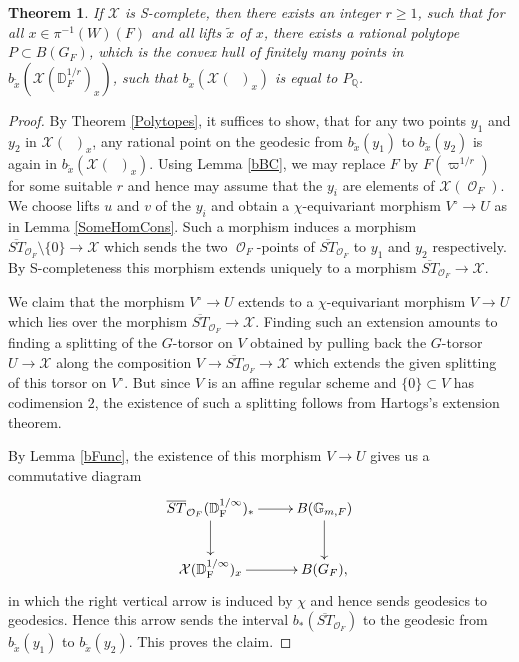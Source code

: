 \documentclass{article}
\DeclareMathOperator{\CO}{\mathcal{O}}
\newcommand{\BG}{{\mathbb{G}}}
\newcommand{\BQ}{{\mathbb{Q}}}
\newcommand{\CX}{{\mathcal X}}
\newcommand{\Dr}[1][r]{\mathbb{D}_F^{1/#1}}
\DeclareMathOperator{\Dinfty}{\mathbb{D}_F^{1/\infty}}
\theoremstyle{definition}
\theoremstyle{plain}
\newtheorem{theorem}[definition]{Theorem}
\begin{document}
\begin{theorem}\label{conhul}
    If $\CX$ is S-complete, then there exists an integer $r \geq 1$, such that for all $x \in \pi^{-1}(W)(F)$ and all lifts $\tilde x$ of $x$, there exists a rational polytope $P \subset B(G_F)$, which is the convex hull of finitely many points in $b_{\tilde x}(\CX(\Dr)_x)$, such that $b_{\tilde x}(\CX(\Dinfty)_x)$ is equal to $P_\BQ$. 
\end{theorem}
\begin{proof}
    By Theorem \ref{Polytopes}, it suffices to show, that for any two points $y_1$ and $y_2$ in $\CX(\Dinfty)_x$, any rational point on the geodesic from $b_{\tilde x}(y_1)$ to $b_{\tilde x}(y_2)$ is again in $b_{\tilde x}(\CX(\Dinfty)_x)$. Using Lemma \ref{bBC}, we may replace $F$ by $F(\varpi^{1/r})$ for some suitable $r$ and hence may assume that the $y_i$ are elements of $\CX(\CO_F)$. We choose lifts $u$ and $v$ of the $y_i$ and obtain a $\chi$-equivariant morphism $V^\circ \to U$ as in Lemma \ref{SomeHomCons}. Such a morphism induces a morphism $\overline{ST}_{\CO_F} \setminus \{0\} \to \CX$ which sends the two $\CO_F$-points of $\overline{ST}_{\CO_F}$ to $y_1$ and $y_2$ respectively. By S-completeness this morphism extends uniquely to a morphism $\overline{ST}_{\CO_F} \to \CX$. 

    We claim that the morphism $V^\circ \to U$ extends to a $\chi$-equivariant morphism $V \to U$ which lies over the morphism $\overline{ST}_{\CO_F} \to \CX$. Finding such an extension amounts to finding a splitting of the $G$-torsor on $V$ obtained by pulling back the $G$-torsor $U \to \CX$ along the composition $V \to \overline{ST}_{\CO_F} \to \CX$ which extends the given splitting of this torsor on $V^\circ$. But since $V$ is an affine regular scheme and $\{0\} \subset V$ has codimension $2$, the existence of such a splitting follows from Hartogs's extension theorem.

    By Lemma \ref{bFunc}, the existence of this morphism $V \to U$ gives us a commutative diagram
    \begin{equation*}
        \xymatrix{
            \overline{ST}_{\CO_F}(\Dinfty)_{\ast} \ar[r] \ar[d] & B(\BG_{m,F}) \ar[d] \\
            \CX(\Dinfty)_x \ar[r] & B(G_F),
        }
    \end{equation*}
    in which the right vertical arrow is induced by $\chi$ and hence sends geodesics to geodesics. Hence this arrow sends the interval $b_*(\overline{ST}_{\CO_F})$ to the geodesic from $b_{\tilde x}(y_1)$ to $b_{\tilde x}(y_2)$. This proves the claim.
\end{proof}
    
\end{document}
